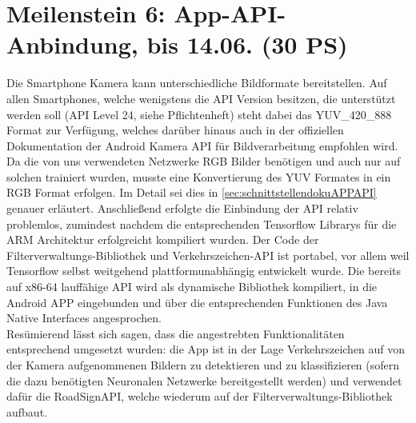 \documentclass[12pt,a4paper,ngerman,enabledeprecatedfontcommands]{scrreprt}
\begin{document}
\section[Meilenstein 6: App-API-Anbindung]{Meilenstein 6: App-API-Anbindung, bis 14.06. (30 PS)}
Die Smartphone Kamera kann unterschiedliche Bildformate bereitstellen. Auf allen Smartphones, welche wenigstens die API Version besitzen, die unterstützt werden soll (API Level 24, siehe Pflichtenheft) steht dabei das YUV\_420\_888 Format zur Verfügung, welches darüber hinaus auch in der offiziellen Dokumentation der Android Kamera API für Bildverarbeitung empfohlen wird. Da die von uns verwendeten Netzwerke RGB Bilder benötigen und auch nur auf solchen trainiert wurden, musste eine Konvertierung des YUV Formates in ein RGB Format erfolgen. Im Detail sei dies in \cref{sec:schnittstellendokuAPPAPI} genauer erläutert. Anschließend erfolgte die Einbindung der API relativ problemlos, zumindest nachdem die entsprechenden Tensorflow Librarys für die ARM Architektur erfolgreicht kompiliert wurden. Der Code der Filterverwaltungs-Bibliothek und Verkehrszeichen-API ist portabel, vor allem weil Tensorflow selbst weitgehend plattformunabhängig entwickelt wurde. Die bereits auf x86-64 lauffähige API wird als dynamische Bibliothek kompiliert, in die Android APP eingebunden und über die entsprechenden Funktionen des Java Native Interfaces angesprochen.\\
Resümierend lässt sich sagen, dass die angestrebten Funktionalitäten entsprechend umgesetzt wurden: die App ist in der Lage Verkehrszeichen auf von der Kamera aufgenommenen Bildern zu detektieren und zu klassifizieren (sofern die dazu benötigten Neuronalen Netzwerke bereitgestellt werden) und verwendet dafür die RoadSignAPI, welche wiederum auf der Filterverwaltungs-Bibliothek aufbaut.
\end{document}
